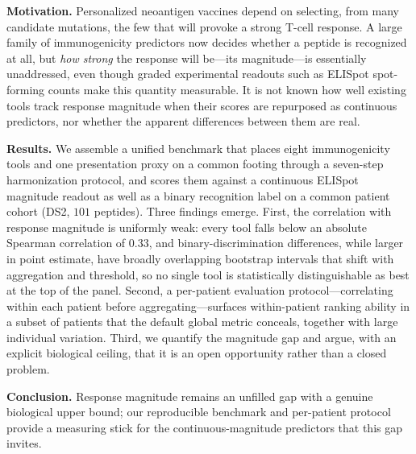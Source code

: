 \noindent\textbf{Motivation.} Personalized neoantigen vaccines depend on
selecting, from many candidate mutations, the few that will provoke a strong
T-cell response. A large family of immunogenicity predictors now decides whether
a peptide is recognized at all, but \emph{how strong} the response will
be---its magnitude---is essentially unaddressed, even though graded experimental
readouts such as ELISpot spot-forming counts make this quantity measurable. It is
not known how well existing tools track response magnitude when their scores are
repurposed as continuous predictors, nor whether the apparent differences between
them are real.

\noindent\textbf{Results.} We assemble a unified benchmark that places eight
immunogenicity tools and one presentation proxy on a common footing through a
seven-step harmonization protocol, and scores them against a continuous ELISpot
magnitude readout as well as a binary recognition label on a common patient
cohort (DS2, $101$ peptides). Three findings emerge. First, the correlation with
response magnitude is uniformly weak: every tool falls below an absolute Spearman
correlation of $0.33$, and binary-discrimination differences, while larger in
point estimate, have broadly overlapping bootstrap intervals that shift with
aggregation and threshold, so no single tool is statistically distinguishable as
best at the top of the panel. Second, a per-patient evaluation
protocol---correlating within each patient before aggregating---surfaces
within-patient ranking ability in a subset of patients that the default global
metric conceals, together with large individual variation. Third, we quantify
the magnitude gap and argue, with an explicit biological ceiling, that it is an
open opportunity rather than a closed problem.

\noindent\textbf{Conclusion.} Response magnitude remains an unfilled gap with a
genuine biological upper bound; our reproducible benchmark and per-patient
protocol provide a measuring stick for the continuous-magnitude predictors that
this gap invites.
